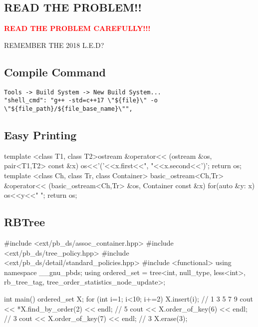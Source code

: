\subsection{READ THE PROBLEM!!}
{\Large \textbf{\textcolor{red}{READ THE PROBLEM CAREFULLY!!!}}}

REMEMBER THE 2018 L.E.D?

\subsection{Compile Command}
\begin{verbatim}
Tools -> Build System -> New Build System...
"shell_cmd": "g++ -std=c++17 \"${file}\" -o
\"${file_path}/${file_base_name}\"",
\end{verbatim}

\subsection{Easy Printing}
\begin{cpp}
template <class T1, class T2>ostream &operator<<
  (ostream &os, pair<T1,T2> const &x){
  os<<'('<<x.first<<", "<<x.second<<')'; return os;
}
template <class Ch, class Tr, class Container>
  basic_ostream<Ch,Tr> &operator<<
  (basic_ostream<Ch,Tr> &os, Container const &x){
  for(auto &y: x) os<<y<<" "; return os;
}
\end{cpp}

\subsection{RBTree}
\begin{cpp}
#include <ext/pb_ds/assoc_container.hpp>
#include <ext/pb_ds/tree_policy.hpp>
#include <ext/pb_ds/detail/standard_policies.hpp>
#include <functional>
using namespace __gnu_pbds;
using ordered_set = tree<int, null_type, less<int>,
  rb_tree_tag, tree_order_statistics_node_update>;

int main(){
  ordered_set X;
  for (int i=1; i<10; i+=2) X.insert(i); // 1 3 5 7 9
  cout << *X.find_by_order(2) << endl; // 5
  cout << X.order_of_key(6) << endl; // 3
  cout << X.order_of_key(7) << endl; // 3
  X.erase(3);
}
\end{cpp}